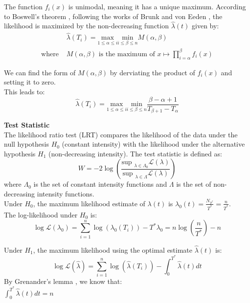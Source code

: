 \documentclass{journalstyle}
\begin{document}
The function $f_i(x)$ is unimodal, meaning it has a unique maximum.
According to Boswell's theorem \cite{Boswell1966}, following the works of Brunk and von Eeden \cite{VanEeden1956}, the likelihood is maximized by the non-decreasing function $\hat{\lambda}(t)$ given by: \\
\begin{equation*}
    \begin{split}
        &\hat{\lambda}(T_i) = \underset{1 \leq \alpha \leq i}{\text{max}} \underset{i \leq \beta \leq n}{\text{min}} M(\alpha, \beta) \\
        \text{where } &M(\alpha, \beta) \text{ is the maximum of } x \mapsto \prod_{i=\alpha}^{\beta} f_i(x)
    \end{split}
    \label{eq:boswell_optimal_lambda}
\end{equation*}

We can find the form of $M(\alpha, \beta)$ by derviating the product of $f_i(x)$ and setting it to zero. \\
This leads to: \\
\begin{equation}
    \hat{\lambda}(T_i) = \underset{1 \leq \alpha \leq i}{\text{max}} \underset{i \leq \beta \leq n}{\text{min}} \frac{\beta - \alpha + 1}{T_{\beta + 1} - T_{\alpha}}
    \label{eq:boswell_optimal_lambda_formula}
\end{equation}

\noindent\textbf{Test Statistic} \\
The likelihood ratio test (LRT) compares the likelihood of the data under the null hypothesis $H_0$ (constant intensity) with the likelihood under the alternative hypothesis $H_1$ (non-decreasing intensity).
The test statistic is defined as: \\
$$
W = -2 \log \left( \frac{\text{sup }_{\lambda \in \Lambda_0} \mathcal{L}(\lambda)}{\text{sup }_{\lambda \in \Lambda} \mathcal{L}(\lambda)} \right)
$$
where $\Lambda_0$ is the set of constant intensity functions and $\Lambda$ is the set of non-decreasing intensity functions. \\

Under $H_0$, the maximum likelihood estimate of $\lambda(t)$ is $\lambda_0(t) = \frac{N_{T^*}}{T^*} = \frac{n}{T^*}$. \\
The log-likelihood under $H_0$ is:
$$
\log\mathcal{L}(\lambda_0) = \sum_{i=1}^n \log(\lambda_0(T_i)) - T^* \lambda_0 = n \log\left(\frac{n}{T^*}\right) - n
$$

Under $H_1$, the maximum likelihood using the optimal estimate $\hat{\lambda}(t)$ is:
$$
\log\mathcal{L}(\hat{\lambda}) = \sum_{i=1}^n \log(\hat{\lambda}(T_i)) - \int_0^{T^*} \hat{\lambda}(t) dt
$$
By Grenander's lemma \cite{Grenander1956}, we know that: \\
$\int_0^{T^*} \hat{\lambda}(t) dt = n$ \\
\end{document}
